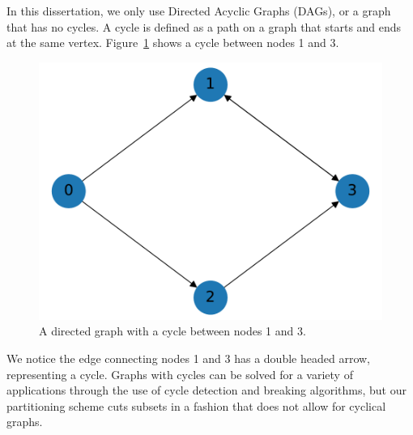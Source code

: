 In this dissertation, we only use Directed Acyclic Graphs (DAGs), or a graph that has no cycles.  A cycle is defined as a path on a graph that starts and ends at the same vertex. Figure~\ref{cycle_example} shows a cycle between nodes 1 and 3.
\begin{figure}[H]
\centering
\includegraphics[scale=0.5]{../../figures/cycle_example.pdf}
\caption{A directed graph with a cycle between nodes 1 and 3.}
\label{cycle_example}
\end{figure}
We notice the edge connecting nodes 1 and 3 has a double headed arrow, representing a cycle.
Graphs with cycles can be solved for a variety of applications through the use of cycle detection and breaking algorithms, but our partitioning scheme cuts subsets in a fashion that does not allow for cyclical graphs.

